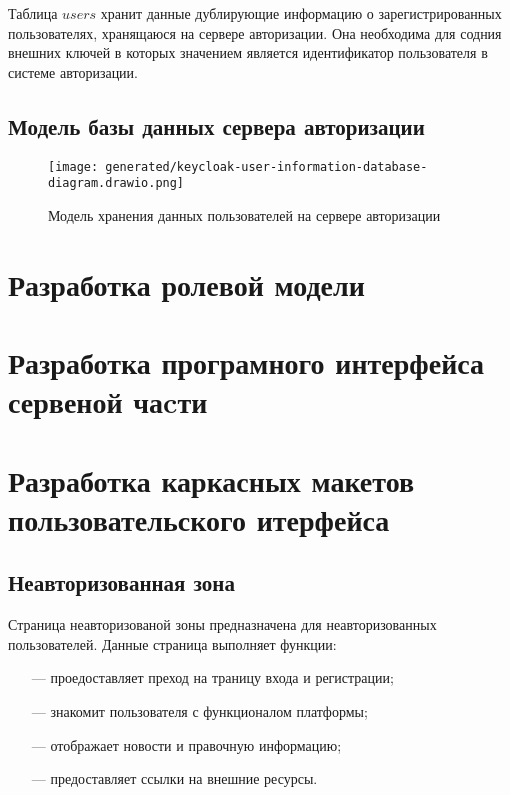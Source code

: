 Таблица $users$ хранит данные дублирующие информацию о зарегистрированных пользователях, хранящаюся на сервере авторизации. Она необходима для содния внешних ключей в которых значением является идентификатор пользователя в системе авторизации.

\subsection{Модель базы данных сервера авторизации}



\begin{figure*}[!t]
  \centering
  \texttt{[image: generated/keycloak-user-information-database-diagram.drawio.png]}
  \caption{Модель хранения данных пользователей на сервере авторизации}
  \label{KeyclaokDatabaseDiagram}
\end{figure*}

\section{Разработка ролевой модели}

\section{Разработка програмного интерфейса сервеной чаcти}

\section{Разработка каркасных макетов пользовательского итерфейса}

\subsection{Неавторизованная зона}

Страница неавторизованой зоны предназначена для неавторизованных пользователей. Данные страница выполняет функции:

\begin{itemize}
  \item[---] проедоставляет преход на траницу входа и регистрации;
  \item[---] знакомит пользователя с функционалом платформы;
  \item[---] отображает новости и правочную информацию;
  \item[---] предоставляет ссылки на внешние ресурсы.
\end{itemize}

